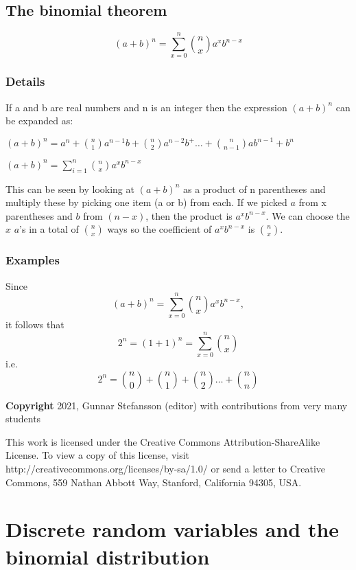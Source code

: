 \documentclass[12pt,a4paper]{article}
\theoremstyle{regla}
\theoremstyle{remark}
\theoremstyle{definition}
\theoremstyle{nonumberbreak}
\begin{document}
\subsection{The binomial theorem}
\begin{fbox}
\begin{minipage}{0.97\textwidth}
$$(a+b)^n  = \sum_{x=0}^n {n \choose x} a^xb^{n-x}$$
\end{minipage}
\end{fbox}
\subsubsection{Details}
If a and b are real numbers and n is an integer then the expression $(a+b)^n$  can be expanded as:

$ (a+b)^n = a^n+ {n \choose 1}a^{n-1}b +  {n \choose 2}a^{n-2}b^ + \ldots +{n \choose n-1}ab^{n-1}+b^n$  

$ (a+b)^n  = \sum_{i=1}^n  {n \choose x}a^xb^{n-x}$   

This can be seen by looking at $(a+b)^ n$ as a product of n parentheses  and multiply these by picking one item (a or b) from each. If we picked $a$  from x parentheses and $b$ from $(n-x)$, then the product is $a^x b^{n-x}$. We can choose the $x$ $a$'s in a total of $\binom{n}{x}$ ways so the coefficient of $a^xb^{n-x}$ is $\binom{n}{x}$.

\subsubsection{Examples}
\begin{xmpl}
Since
$$(a+b)^n  = \sum_{x=0}^n {n \choose x} a^xb^{n-x},$$
it follows that
$$2^n = (1+1)^n  = \sum_{x=0}^n {n \choose x}$$
i.e.
$$2^n = {n \choose 0} + {n \choose 1} + {n \choose 2}\ldots+ {n \choose n}$$

\end{xmpl}

{\bf Copyright}
2021, Gunnar Stefansson (editor) with contributions from very many students

This work is licensed under the Creative Commons
Attribution-ShareAlike License. To view a copy of this license, visit
http://creativecommons.org/licenses/by-sa/1.0/ or send a letter to
Creative Commons, 559 Nathan Abbott Way, Stanford, California 94305,
USA.
\clearpage
\section{Discrete random variables and the binomial distribution}
\end{document}
